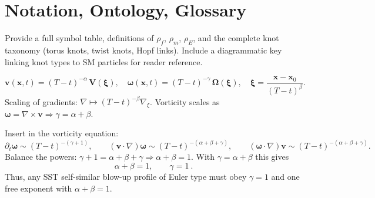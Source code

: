 \documentclass[10pt,reprint,aps,onecolumn,nofootinbib]{revtex4-2}
\begin{document}
    \section{Notation, Ontology, Glossary}
    \label{canon58:appI}
    Provide a full symbol table, definitions of $\rho_{\!f}$, $\rho_{\!m}$, $\rho_{\!E}$,
    and the complete knot taxonomy (torus knots, twist knots, Hopf links).
    Include a diagrammatic key linking knot types to SM particles for reader reference.



%
    \[
        \mathbf{v}(\mathbf{x},t) = (T-t)^{-\alpha}\, \mathbf{V}\!\left(\boldsymbol{\xi}\right),\quad
        \boldsymbol{\omega}(\mathbf{x},t) = (T-t)^{-\gamma}\, \boldsymbol{\Omega}\!\left(\boldsymbol{\xi}\right),\quad
        \boldsymbol{\xi} = \frac{\mathbf{x}-\mathbf{x}_0}{(T-t)^{\beta}} .
    \]
    Scaling of gradients: \(\nabla \mapsto (T-t)^{-\beta}\nabla_{\!\xi}\).
    Vorticity scales as \(\boldsymbol{\omega}=\nabla\times\mathbf{v}\Rightarrow \gamma=\alpha+\beta\).

    Insert in the vorticity equation:
    \[
        \partial_t \boldsymbol{\omega}\sim (T-t)^{-(\gamma+1)},\qquad
        (\mathbf{v}\!\cdot\!\nabla)\boldsymbol{\omega}\sim (T-t)^{-(\alpha+\beta+\gamma)},\qquad
        (\boldsymbol{\omega}\!\cdot\!\nabla)\mathbf{v}\sim (T-t)^{-(\alpha+\beta+\gamma)} .
    \]
    Balance the powers: \(\gamma+1=\alpha+\beta+\gamma \Rightarrow \alpha+\beta=1\).
    With \(\gamma=\alpha+\beta\) this gives
    \[
        \boxed{\ \alpha+\beta=1,\qquad \gamma=1\ } .
    \]
    Thus, any SST self-similar blow-up profile of Euler type must obey \(\gamma=1\) and one free exponent with \(\alpha+\beta=1\).
\end{document}

